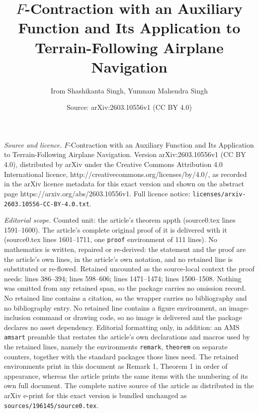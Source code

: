 \documentclass[10pt,a4paper]{amsart}
\title{$F$-Contraction with an Auxiliary Function and Its Application to Terrain-Following Airplane Navigation}
\author{Irom Shashikanta Singh, Yumnam Mahendra Singh}
\date{Source: arXiv:2603.10556v1 (CC BY 4.0)}
\begin{document}
\maketitle

\noindent\emph{Source and licence.} $F$-Contraction with an Auxiliary Function and Its Application to Terrain-Following Airplane Navigation. Version arXiv:2603.10556v1 (CC BY 4.0), distributed by arXiv under the Creative Commons Attribution 4.0 International licence, http://creativecommons.org/licenses/by/4.0/, as recorded in the arXiv licence metadata for this exact version and shown on the abstract page https://arxiv.org/abs/2603.10556v1. Full licence notice: \texttt{licenses/arxiv-2603.10556-CC-BY-4.0.txt}.\par\smallskip

\noindent\textit{Editorial scope.} Counted unit: the article's theorem appth (source0.tex lines 1591--1600). The article's complete original proof of it is delivered with it (source0.tex lines 1601--1711, one \texttt{proof} environment of 111 lines). No mathematics is written, repaired or re-derived: the statement and the proof are the article's own lines, in the article's own notation, and no retained line is substituted or re-flowed.  Retained uncounted as the source-local context the proof needs: lines 386--394; lines 598--606; lines 1471--1474; lines 1500--1508.  Nothing was omitted from any retained span, so the package carries no omission record.  No retained line contains a citation, so the wrapper carries no bibliography and no bibliography entry.  No retained line contains a figure environment, an image-inclusion command or drawing code, so no image is delivered and the package declares no asset dependency.  Editorial formatting only, in addition: an AMS \texttt{amsart} preamble that restates the article's own declarations and macros used by the retained lines, namely the environments \texttt{remark}, \texttt{theorem} on separate counters, together with the standard packages those lines need.  The retained environments print in this document as Remark 1, Theorem 1 in order of appearance, whereas the article prints the same items with the numbering of its own full document.  The complete native source of the article as distributed in the arXiv e-print for this exact version is bundled unchanged as \texttt{sources/196145/source0.tex}.
\end{document}
